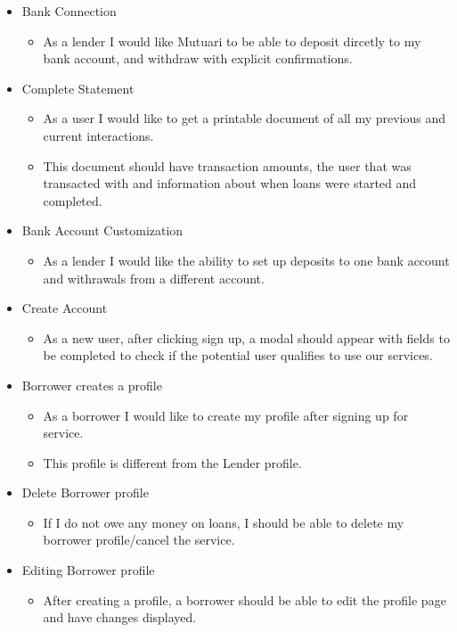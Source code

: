 \begin{itemize}
	\item Bank Connection
	\begin{itemize}
		\item As a lender I would like Mutuari to be able to deposit dircetly to my bank account, and withdraw with explicit confirmations.
	\end{itemize}

	\item Complete Statement
	\begin{itemize}
		\item As a user I would like to get a printable document of all my previous and current interactions.
		\item This document should have transaction amounts, the user that was transacted with and information about when loans were started and completed.
	\end{itemize}

	\item Bank Account Customization
	\begin{itemize}
		\item As a lender I would like the ability to set up deposits to one bank account and withrawals from a different account.
	\end{itemize}

	\item Create Account
	\begin{itemize}
		\item As a new user, after clicking sign up, a modal should appear with fields to be completed to check if the potential user qualifies to use our services.
	\end{itemize}

	\item Borrower creates a profile
	\begin{itemize}
		\item As a borrower I would like to create my profile after signing up for service.
		\item This profile is different from the Lender profile.
	\end{itemize}

	\item Delete Borrower profile
	\begin{itemize}
		\item If I do not owe any money on loans, I should be able to delete my borrower profile/cancel the service.
	\end{itemize}

	\item Editing Borrower profile
	\begin{itemize}
		\item After creating a profile, a borrower should be able to edit the profile page and have changes displayed.
	\end{itemize}


\end{itemize}
